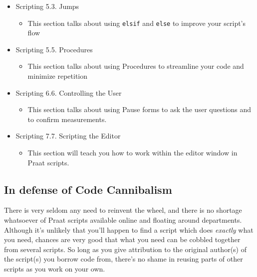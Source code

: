 \begin{itemize}
\tightlist
\item
  Scripting 5.3. Jumps

  \begin{itemize}
  \tightlist
  \item
    This section talks about using \texttt{elsif} and \texttt{else} to
    improve your script's flow
  \end{itemize}
\item
  Scripting 5.5. Procedures

  \begin{itemize}
  \tightlist
  \item
    This section talks about using Procedures to streamline your code
    and minimize repetition
  \end{itemize}
\item
  Scripting 6.6. Controlling the User

  \begin{itemize}
  \tightlist
  \item
    This section talks about using Pause forms to ask the user questions
    and to confirm measurements.
  \end{itemize}
\item
  Scripting 7.7. Scripting the Editor

  \begin{itemize}
  \tightlist
  \item
    This section will teach you how to work within the editor window in
    Praat scripts.
  \end{itemize}
\end{itemize}

\hypertarget{in-defense-of-code-cannibalism}{%
\subsection{In defense of Code
Cannibalism}\label{in-defense-of-code-cannibalism}}

There is very seldom any need to reinvent the wheel, and there is no
shortage whatsoever of Praat scripts available online and floating
around departments. Although it's unlikely that you'll happen to find a
script which does \emph{exactly} what you need, chances are very good
that what you need can be cobbled together from several scripts. So long
as you give attribution to the original author(s) of the script(s) you
borrow code from, there's no shame in reusing parts of other scripts as
you work on your own.

